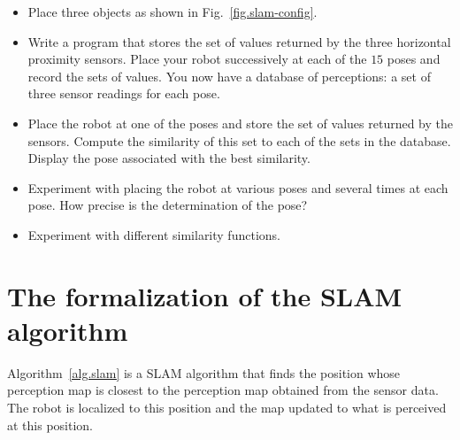 \begin{framed}
\begin{itemize}
\item Place three objects as shown in Fig.~\ref{fig.slam-config}.
\item Write a program that stores the set of values returned by the three horizontal proximity sensors. Place your robot successively at each of the $15$ poses and record the sets of values. You now have a database of perceptions: a set of three sensor readings for each pose.
\item Place the robot at one of the poses and store the set of values returned by the sensors. Compute the  similarity of this set to each of the sets in the database. Display the pose associated with the best similarity.
\item Experiment with placing the robot at various poses and several times at each pose. How precise is the determination of the pose?
\item Experiment with different similarity functions.
\end{itemize}
\end{framed}

\section{The formalization of the SLAM algorithm}\label{s.slam-formal}

Algorithm~\ref{alg.slam} is a SLAM algorithm that finds the position whose perception map is closest to the perception map obtained from the sensor data. The robot is localized to this position and the map updated to what is perceived at this position.

